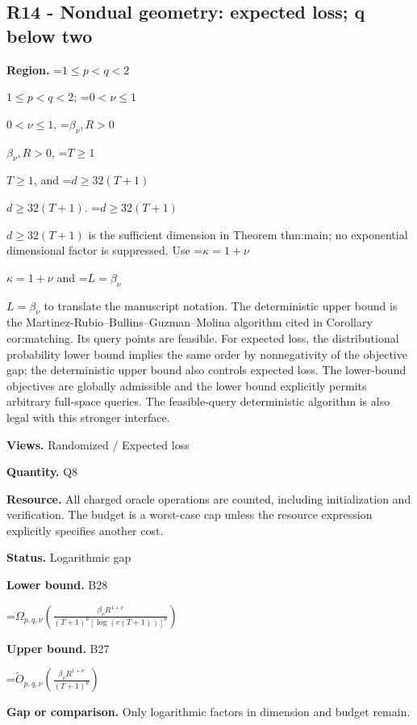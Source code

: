 \documentclass[10pt,a4paper]{article}
\newcommand{\AtlasMath}[1]{\par\begingroup\centering\setbox0=\hbox{$\displaystyle #1$}\ifdim\wd0>1.4\linewidth\typeout{ATLAS WIDE FORMULA: \the\wd0}\fi\ifdim\wd0>\linewidth\resizebox{\linewidth}{!}{\box0}\else\box0\fi\par\endgroup}
\newcommand{\AtlasInlineMath}[1]{\begingroup\setbox0=\hbox{$#1$}\ifdim\wd0>.4\linewidth\endgroup\AtlasMath{#1}\else\endgroup$#1$\fi}
\begin{document}
\subsection{R14 - Nondual geometry: expected loss; q below two}


\textbf{Region.} \AtlasInlineMath{1\le p<q<2}; \AtlasInlineMath{0<\nu\le1}, \AtlasInlineMath{\beta_\nu,R>0}, \AtlasInlineMath{T\ge1}, and \AtlasInlineMath{d\ge32(T+1)}. \AtlasInlineMath{d\ge32(T+1)} is the sufficient dimension in Theorem thm:main; no exponential dimensional factor is suppressed. Use \AtlasInlineMath{\kappa=1+\nu} and \AtlasInlineMath{L=\beta_\nu} to translate the manuscript notation. The deterministic upper bound is the Martinez-Rubio--Bullins--Guzman--Molina algorithm cited in Corollary cor:matching. Its query points are feasible. For expected loss, the distributional probability lower bound implies the same order by nonnegativity of the objective gap; the deterministic upper bound also controls expected loss. The lower-bound objectives are globally admissible and the lower bound explicitly permits arbitrary full-space queries. The feasible-query deterministic algorithm is also legal with this stronger interface.



\textbf{Views.} Randomized / Expected loss



\textbf{Quantity.} Q8



\textbf{Resource.} All charged oracle operations are counted, including initialization and verification. The budget is a worst-case cap unless the resource expression explicitly specifies another cost.



\textbf{Status.} Logarithmic gap



\textbf{Lower bound.} B28



\AtlasMath{\Omega_{p,q,\nu}\!\left(\frac{\beta_\nu R^{1+\nu}}{(T+1)^a[\log(e(T+1))]^\nu}\right)}


\textbf{Upper bound.} B27



\AtlasMath{\widetilde O_{p,q,\nu}\!\left(\frac{\beta_\nu R^{1+\nu}}{(T+1)^a}\right)}


\textbf{Gap or comparison.} Only logarithmic factors in dimension and budget remain.
\end{document}
